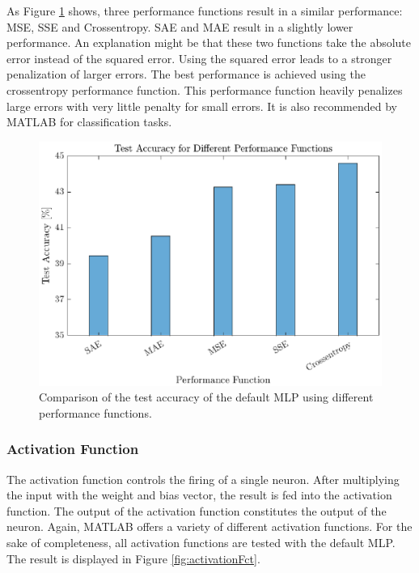  As Figure \ref{fig:performFct} shows, three performance functions result in a similar performance: MSE, SSE and Crossentropy. SAE and MAE result in a slightly lower performance. An explanation might be that these two functions take the absolute error instead of the squared error. Using the squared error leads to a stronger penalization of larger errors. The best performance is achieved using the crossentropy performance function. This performance function heavily penalizes large errors with very little penalty for small errors. It is also recommended by MATLAB for classification tasks.

 \begin{figure}[h!]
 	\centering
 	\includegraphics{images/performFct}
 	\caption{Comparison of the test accuracy of the default MLP using different performance functions.}
 	\label{fig:performFct}
 \end{figure}

 \subsubsection{Activation Function}

 The activation function controls the firing of a single neuron. After multiplying the input with the weight and bias vector, the result is fed into the activation function. The output of the activation function constitutes the output of the neuron. Again, MATLAB offers a variety of different activation functions. For the sake of completeness, all activation functions are tested with the default MLP. The result is displayed in Figure \ref{fig:activationFct}.

